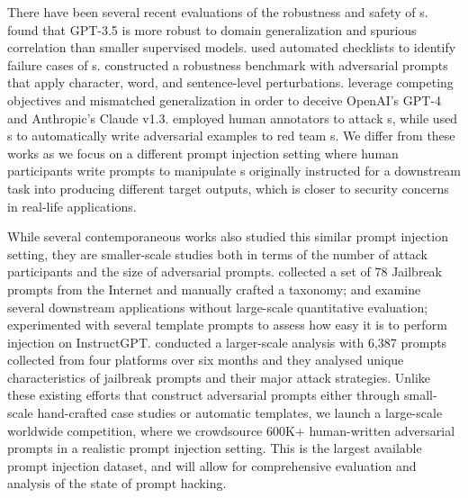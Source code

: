 

There have been several recent evaluations of the robustness and safety of \llm{}s. \citet{Si2022PromptingGT} found that GPT-3.5 is more
robust to domain generalization and spurious correlation than smaller
supervised models. 
\citet{Ribeiro2020BeyondAB} used automated checklists to identify failure cases of \llm{}s.
\citet{Zhu2023PromptBenchTE} constructed a robustness
benchmark with adversarial prompts that apply character, word, and
sentence-level perturbations.  \citet{alex2023jailbroken} leverage competing objectives and mismatched generalization in order to deceive OpenAI's GPT-4 and Anthropic's Claude v1.3. \citet{Ganguli2022RedTL} employed human
annotators to attack \llm{}s, while \citet{Perez2022RedTL} used \llm{}s to
automatically write adversarial examples to red team \llm{}s. 
We differ from
these works as we focus on a different prompt injection setting where human participants write prompts to manipulate \llm{}s originally instructed for a downstream task into producing different target outputs, which is closer to security concerns in real-life \llm{} applications. 


While several contemporaneous works also studied this similar prompt injection setting, they are smaller-scale studies both in terms of the
number of attack participants and the size of adversarial prompts. 
\citet{Liu2023JailbreakingCV} collected a set of 78 Jailbreak prompts from the Internet and manually crafted a taxonomy;  \citet{greshake2023youve} and \citet{liu2023prompt} examine several downstream applications without large-scale quantitative evaluation; \citet{perez2022ignore} experimented with several template prompts to assess how easy it is to perform injection on InstructGPT. 
\citet{Shen2023DoAN} conducted a larger-scale analysis with 6,387 prompts collected from four platforms over six months and they analysed unique characteristics of jailbreak prompts and their major attack strategies. 
Unlike these existing efforts that construct adversarial prompts either through small-scale hand-crafted case studies or automatic templates, 
we launch a large-scale 
worldwide competition, where we crowdsource 600K+ human-written adversarial prompts in a realistic prompt injection setting. This is the largest available prompt injection dataset, and will allow for
comprehensive evaluation and analysis of the state of prompt hacking.



